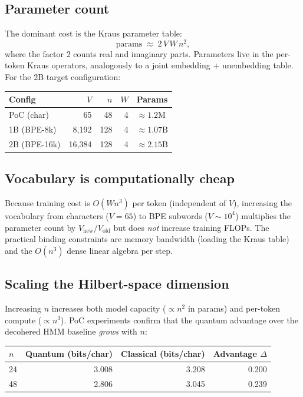 \documentclass[11pt,a4paper]{article}
\theoremstyle{plain}
\begin{document}
\subsection{Parameter count}

The dominant cost is the Kraus parameter table:
\[
  \text{params} \;\approx\; 2\,V\,W\,n^2,
\]
where the factor 2 counts real and imaginary parts. Parameters live
in the per-token Kraus operators, analogously to a joint embedding +
unembedding table. For the 2B target configuration:

\begin{center}
\begin{tabular}{@{}lrrrl@{}}
\toprule
\textbf{Config} & $V$ & $n$ & $W$ & \textbf{Params} \\
\midrule
PoC (char)         & 65    & 48  & 4 & $\approx 1.2\text{M}$ \\
1B (BPE-8k)        & 8{,}192  & 128 & 4 & $\approx 1.07\text{B}$ \\
2B (BPE-16k)       & 16{,}384 & 128 & 4 & $\approx 2.15\text{B}$ \\
\bottomrule
\end{tabular}
\end{center}

\subsection{Vocabulary is computationally cheap}

Because training cost is $O(Wn^3)$ per token (independent of $V$),
increasing the vocabulary from characters ($V=65$) to BPE subwords
($V\sim 10^4$) multiplies the parameter count by $V_{\text{new}}/V_{\text{old}}$
but does \emph{not} increase training FLOPs. The practical binding
constraints are memory bandwidth (loading the Kraus table) and the
$O(n^3)$ dense linear algebra per step.

\subsection{Scaling the Hilbert-space dimension}

Increasing $n$ increases both model capacity ($\propto n^2$ in params)
and per-token compute ($\propto n^3$). PoC experiments confirm that
the quantum advantage over the decohered HMM baseline \emph{grows}
with $n$:

\begin{center}
\begin{tabular}{@{}lrrr@{}}
\toprule
$n$ & Quantum (bits/char) & Classical (bits/char) & Advantage $\Delta$ \\
\midrule
24 & 3.008 & 3.208 & 0.200 \\
48 & 2.806 & 3.045 & 0.239 \\
\bottomrule
\end{tabular}
\end{center}
\end{document}
